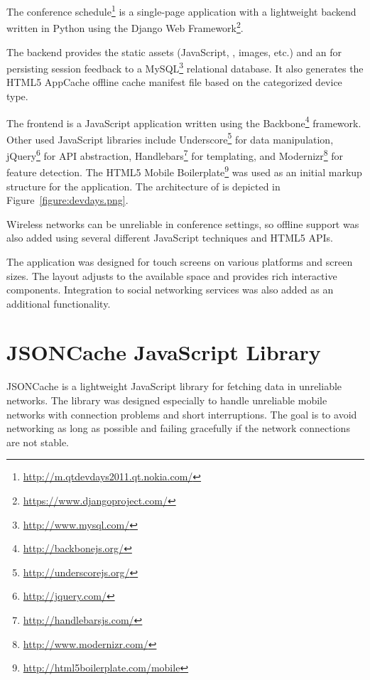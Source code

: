 The conference
schedule\footnote{\url{http://m.qtdevdays2011.qt.nokia.com/}} is a
single-page application \citationneeded with a lightweight backend
written in Python using the Django Web
Framework\footnote{\url{https://www.djangoproject.com/}}.

The backend provides the static assets (JavaScript, ,
images, etc.) and an  for persisting session feedback to a
MySQL\footnote{\url{http://www.mysql.com/}} relational database. It
also generates the HTML5 AppCache \citationneeded offline cache
manifest file based on the categorized device type.

The frontend is a JavaScript application written using the
Backbone\footnote{\url{http://backbonejs.org/}} 
framework. Other used JavaScript libraries include
Underscore\footnote{\url{http://underscorejs.org/}} for data
manipulation, jQuery\footnote{\url{http://jquery.com/}} for 
API abstraction, Handlebars\footnote{\url{http://handlebarsjs.com/}}
for templating, and
Modernizr\footnote{\url{http://www.modernizr.com/}} for feature
detection. The HTML5 Mobile
Boilerplate\footnote{\url{http://html5boilerplate.com/mobile}} was
used as an initial markup structure for the application. The
architecture of is depicted in Figure~\ref{figure:devdays.png}.

Wireless networks can be unreliable in conference settings, so offline
support was also added using several different JavaScript techniques
and HTML5 APIs.

The application was designed for touch screens on various platforms
and screen sizes. The layout adjusts to the available space and
provides rich interactive components. Integration to social networking
services was also added as an additional functionality.


\section{JSONCache JavaScript Library}
\label{section:jsoncache}

JSONCache is a lightweight JavaScript library for fetching 
data in unreliable networks. The library was designed especially to
handle unreliable mobile networks with connection problems and short
interruptions. The goal is to avoid networking as long as possible and
failing gracefully if the network connections are not stable.

